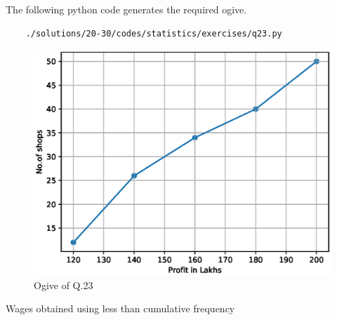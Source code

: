 	
		The following python code generates the required ogive.
	\begin{lstlisting}
	./solutions/20-30/codes/statistics/exercises/q23.py
	\end{lstlisting}


	
	\begin{figure}[!ht]
	\centering
	\includegraphics[width=\columnwidth]{./solutions/20-30/figs/statistics/exercises/ex_q23.eps}
	\caption{Ogive of Q.23}
	\label{fig:q23_ogive}	
	\end{figure}
	
	\begin{table}[ht]
	\begin{center}
    	
	\caption{Wages obtained using less than cumulative frequency}
	\label{table:table3}
	\end{center}
	\end{table}


